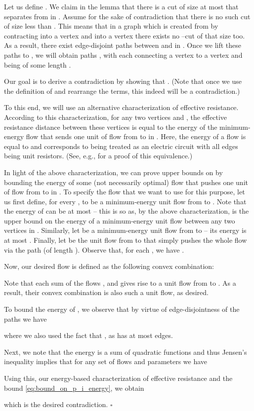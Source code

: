 \documentclass[11pt, letterpaper]{article}
\newenvironment{proof}{\noindent{\bf Proof:}\hspace*{1em}}{\qed\bigskip}
\newcommand{\qed}{\hfill\ensuremath{\square}}
\begin{document}
\begin{proof}
Let us define . We claim in the lemma that there is a cut of size at most  that separates  from  in . Assume for the sake of contradiction that there is no such cut of size less than . This means that in a graph  which is created from  by contracting  into a vertex  and  into a vertex  there exists no --cut of that size too. As a result, there exist  edge-disjoint paths between  and  in . Once we lift these paths to , we will obtain  paths , with each  connecting a vertex  to a vertex  and being of some length .

Our goal is to derive a contradiction by showing that . (Note that once we use the definition of  and rearrange the terms, this indeed will be a contradiction.) 

To this end, we will use an alternative characterization of effective resistance. According to this characterization, for any two vertices  and , the effective resistance distance  between these vertices is equal to the energy  of the minimum-energy flow  that sends one unit of flow from  to  in . Here, the energy  of a flow  is equal to  and corresponds to  being treated as an electric circuit with all edges being unit resistors. (See, e.g., \cite{LyonsP13,Bollobas98} for a proof of this equivalence.)

In light of the above characterization, we can prove upper bounds on  by bounding the energy of some (not necessarily optimal) flow  that pushes one unit of flow from  to  in . To specify the flow  that we want to use for this purpose, let us first define, for every ,  to be a minimum-energy unit flow from  to . Note that the energy  of  can be at most  -- this is so as, by the above characterization,  is the upper bound on the energy of a minimum-energy unit flow between any two vertices in . Similarly, let  be a minimum-energy unit flow from  to  -- its energy is at most . Finally, let  be the unit flow from  to  that simply pushes the whole flow via the path  (of length ). Observe that, for each , we have . 

Now, our desired flow  is defined as the following convex combination:

Note that each sum of the flows ,  and  gives rise to a unit flow from  to . As a result, their convex combination  is also such a unit flow, as desired.

To bound the energy of , we observe that by virtue of edge-disjointness of the paths  we have

where we also used the fact that , as  has at most  edges.

Next, we note that the energy is a sum of quadratic functions and thus Jensen's inequality implies that for any set of flows  and parameters  we have 
 
Using this, our energy-based characterization of effective resistance and the bound \eqref{eq:bound_on_p_i_energy}, we obtain

which is the desired contradiction.
\end{proof}
\end{document}
